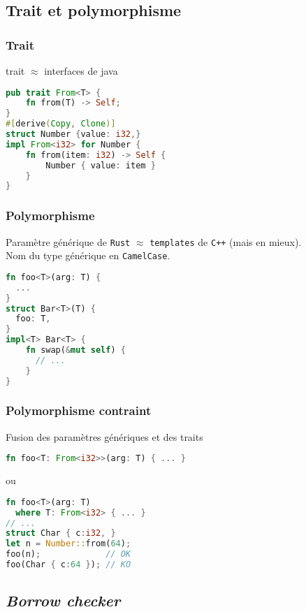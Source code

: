 \subsection{Trait et polymorphisme}
\subsubsection{Trait}
\begin{frame}[fragile]
  trait $\approx$ interfaces de java
      \begin{lstlisting}[language=Rust]
pub trait From<T> {
    fn from(T) -> Self;
}
#[derive(Copy, Clone)]
struct Number {value: i32,}
impl From<i32> for Number {
    fn from(item: i32) -> Self {
        Number { value: item }
    }
}
      \end{lstlisting}
\end{frame}
\subsubsection{Polymorphisme}
\begin{frame}[fragile]
  Paramètre générique de \texttt{Rust} $\approx$ \texttt{templates} de
  \texttt{C++} (mais en mieux).\\
  Nom du type générique en \texttt{CamelCase}.
      \begin{lstlisting}[language=Rust]
fn foo<T>(arg: T) {
  ...
}
struct Bar<T>(T) {
  foo: T,
}
impl<T> Bar<T> {
    fn swap(&mut self) {
      // ...
    }
}
      \end{lstlisting}
\end{frame}
\subsubsection{Polymorphisme contraint}
\begin{frame}[fragile]
  Fusion des paramètres génériques et des traits
      \begin{lstlisting}[language=Rust]
fn foo<T: From<i32>>(arg: T) { ... }
      \end{lstlisting}
      ou
      \begin{lstlisting}[language=Rust]
fn foo<T>(arg: T)
  where T: From<i32> { ... }
// ...
struct Char { c:i32, }
let n = Number::from(64);
foo(n);             // OK
foo(Char { c:64 }); // KO
      \end{lstlisting}
\end{frame}
\subsection{\textit{Borrow checker}}
\begin{frame}
\end{frame}